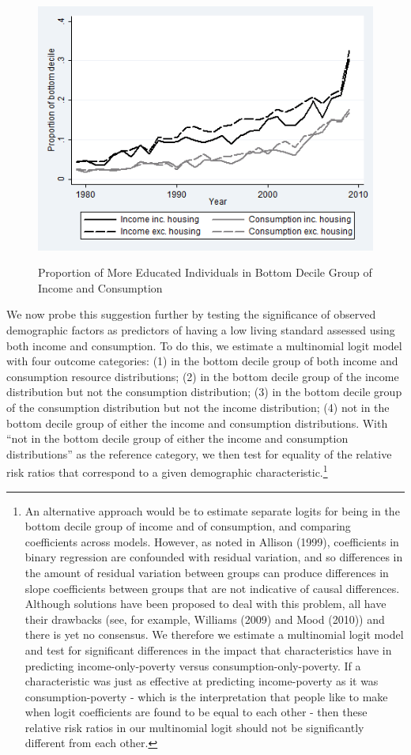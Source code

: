 \begin{figure}
\caption{Proportion of More Educated Individuals in Bottom Decile Group of Income and Consumption}
\centering
\includegraphics[width=.7\linewidth]{pictures/dec_comp4.png}
\label{fig:pov_comp}
\end{figure}

We now probe this suggestion further by testing the significance of observed demographic factors as predictors of having a low living standard assessed using both income and consumption. To do this, we estimate a multinomial logit model with four outcome categories: (1) in the bottom decile group of both income and consumption resource distributions; (2) in the bottom decile group of the income distribution but not the consumption distribution; (3) in the bottom decile group of the consumption distribution but not the income distribution; (4) not in the bottom decile group of either the income and consumption distributions. With ``not in the bottom decile group of either the income and consumption distributions'' as the reference category, we then test for equality of the relative risk ratios that correspond to a given demographic characteristic.\footnote{An alternative approach would be to estimate separate logits for being in the bottom decile group of income and of consumption, and comparing coefficients across models. However, as noted in Allison (1999), coefficients in binary regression are confounded with residual variation, and so differences in the amount of residual variation between groups can produce differences in slope coefficients between groups that are not indicative of causal differences. Although solutions have been proposed to deal with this problem, all have their drawbacks (see, for example, Williams (2009) and Mood (2010)) and there is yet no consensus. We therefore we estimate a multinomial logit model and test for significant differences in the impact that characteristics have in predicting income-only-poverty versus consumption-only-poverty. If a characteristic was just as effective at predicting income-poverty as it was consumption-poverty - which is the interpretation that people like to make when logit coefficients are found to be equal to each other - then these relative risk ratios in our multinomial logit should not be significantly different from each other.}

